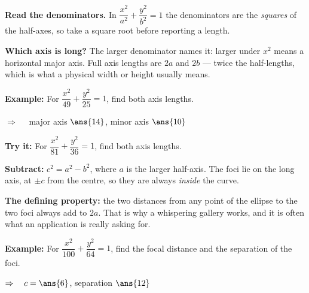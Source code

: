 \documentclass[12pt]{article}
\begin{document}


\begin{formulabox}
\textbf{Read the denominators.} In $\dfrac{x^2}{a^2} + \dfrac{y^2}{b^2} = 1$ the denominators
are the \emph{squares} of the half-axes, so take a square root before reporting a length.\par
\textbf{Which axis is long?} The larger denominator names it: larger under $x^2$ means a
horizontal major axis. Full axis lengths are $2a$ and $2b$ --- twice the half-lengths, which
is what a physical width or height usually means.
\end{formulabox}

\begin{examplebox}
\textbf{Example:} \quad For $\dfrac{x^2}{49} + \dfrac{y^2}{25} = 1$, find both axis lengths.

$\Rightarrow\quad$ major axis $\ans{14}$, \quad minor axis $\ans{10}$
\end{examplebox}

\begin{tryitbox}
\textbf{Try it:} \quad For $\dfrac{x^2}{81} + \dfrac{y^2}{36} = 1$, find both axis lengths.\\[2pt]
\end{tryitbox}


\begin{formulabox}
\textbf{Subtract:} $c^2 = a^2 - b^2$, where $a$ is the larger half-axis. The foci lie on the
long axis, at $\pm c$ from the centre, so they are always \emph{inside} the curve.\par
\textbf{The defining property:} the two distances from any point of the ellipse to the two
foci always add to $2a$. That is why a whispering gallery works, and it is often what an
application is really asking for.
\end{formulabox}

\begin{examplebox}
\textbf{Example:} \quad For $\dfrac{x^2}{100} + \dfrac{y^2}{64} = 1$, find the focal distance and the separation of the foci.

$\Rightarrow\quad c = \ans{6}$, \quad separation $\ans{12}$
\end{examplebox}
\end{document}
